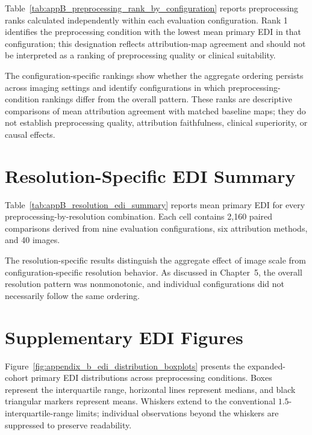 Table~\ref{tab:appB_preprocessing_rank_by_configuration} reports preprocessing ranks calculated independently within each evaluation configuration. Rank 1 identifies the preprocessing condition with the lowest mean primary EDI in that configuration; this designation reflects attribution-map agreement and should not be interpreted as a ranking of preprocessing quality or clinical suitability.



The configuration-specific rankings show whether the aggregate ordering persists across imaging settings and identify configurations in which preprocessing-condition rankings differ from the overall pattern. These ranks are descriptive comparisons of mean attribution agreement with matched baseline maps; they do not establish preprocessing quality, attribution faithfulness, clinical superiority, or causal effects.

\section{Resolution-Specific EDI Summary}

Table~\ref{tab:appB_resolution_edi_summary} reports mean primary EDI for every preprocessing-by-resolution combination. Each cell contains 2,160 paired comparisons derived from nine evaluation configurations, six attribution methods, and 40 images.



The resolution-specific results distinguish the aggregate effect of image scale from configuration-specific resolution behavior. As discussed in Chapter~5, the overall resolution pattern was nonmonotonic, and individual configurations did not necessarily follow the same ordering.

\section{Supplementary EDI Figures}

Figure~\ref{fig:appendix_b_edi_distribution_boxplots} presents the expanded-cohort primary EDI distributions across preprocessing conditions. Boxes represent the interquartile range, horizontal lines represent medians, and black triangular markers represent means. Whiskers extend to the conventional \(1.5\)-interquartile-range limits; individual observations beyond the whiskers are suppressed to preserve readability.

